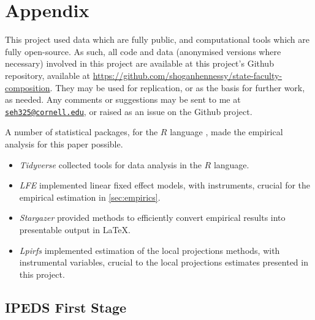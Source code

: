 \newpage
\appendix
\setcounter{table}{0}
\renewcommand{\thetable}{A\arabic{table}}
\setcounter{figure}{0}
\renewcommand{\thefigure}{A\arabic{figure}}

\section{Appendix}
\label{appendix}
This project used data which are fully public, and computational tools which are fully open-source.
As such, all code and data (anonymised versions where necessary) involved in this project are available at this project's Github repository, available at \url{https://github.com/shoganhennessy/state-faculty-composition}.
They may be used for replication, or as the basis for further work, as needed.
Any comments or suggestions may be sent to me at \href{mailto:seh325@cornell.edu}{\nolinkurl{seh325@cornell.edu}}, or raised as an issue on the Github project.

A number of statistical packages, for the $R$ language \citep{R2022}, made the empirical analysis for this paper possible.
\begin{itemize}
    \item \textit{Tidyverse} \citep{tidyverse} collected tools for data analysis in the $R$ language.
    \item \textit{LFE} \citep{lfe} implemented linear fixed effect models, with instruments, crucial for the empirical estimation in \autoref{sec:empirics}.
    \item \textit{Stargazer} \citep{stargazer} provided methods to efficiently convert empirical results into presentable output in \LaTeX.
    \item \textit{Lpirfs} \citep{lpirfs2019} implemented estimation of the \cite{jorda2005} local projections methods, with instrumental variables, crucial to the local projections estimates presented in this project.
\end{itemize}

\subsection{IPEDS First Stage}
\label{sec:appendix-ipeds-firststage}

